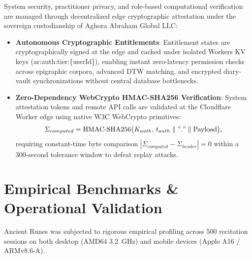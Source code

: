 \documentclass[11pt,a4paper,reqno]{article}
\def\texttt#1{#1}%
\def\mathrm#1{#1}%
\theoremstyle{plain}
\theoremstyle{definition}
\theoremstyle{remark}
\numberwithin{equation}{section}
\begin{document}
System security, practitioner privacy, and role-based computational verification are managed through decentralized edge cryptographic attestation under the sovereign custodianship of Aghora Abraham Global LLC:
\begin{itemize}
    \item \textbf{Autonomous Cryptographic Entitlements}: Entitlement states are cryptographically signed at the edge and cached under isolated Workers KV keys (\texttt{ar:auth:tier:\{userId\}}), enabling instant zero-latency permission checks across epigraphic corpora, advanced DTW matching, and encrypted diary-vault synchronizations without central database bottlenecks.
    \item \textbf{Zero-Dependency WebCrypto HMAC-SHA256 Verification}:
    System attestation tokens and remote API calls are validated at the Cloudflare Worker edge using native W3C WebCrypto primitives:
    \begin{equation}
    \label{eq:webcrypto_hmac}
    \Sigma_{\mathrm{computed}} = \text{HMAC-SHA256}\big( K_{\mathrm{auth}}, \, t_{\mathrm{auth}} \parallel \texttt{"."} \parallel \text{Payload} \big),
    \end{equation}
    requiring constant-time byte comparison $|\Sigma_{\mathrm{computed}} - \Sigma_{\mathrm{header}}| = 0$ within a 300-second tolerance window to defeat replay attacks.
\end{itemize}

\section{\texorpdfstring{Empirical Benchmarks \& Operational Validation}{Empirical Benchmarks and Operational Validation}}
\label{sec:benchmarks}

Ancient Runes was subjected to rigorous empirical profiling across 500 recitation sessions on both desktop (AMD64 3.2~GHz) and mobile devices (Apple A16 / ARMv8.6-A).
\end{document}
